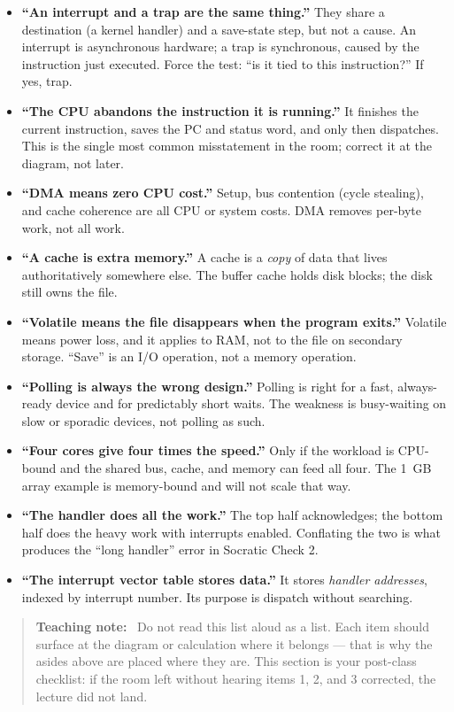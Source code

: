 \documentclass[11pt]{article}
\newenvironment{teachingaside}{\begin{quote}\small\color{primary-gold}\textbf{Teaching note:}\ }{\end{quote}}
\begin{document}
\begin{itemize}
  \item \textbf{``An interrupt and a trap are the same thing.''} They share a
    destination (a kernel handler) and a save-state step, but not a cause. An
    interrupt is asynchronous hardware; a trap is synchronous, caused by the
    instruction just executed. Force the test: ``is it tied to this
    instruction?'' If yes, trap.
  \item \textbf{``The CPU abandons the instruction it is running.''} It finishes
    the current instruction, saves the PC and status word, and only then
    dispatches. This is the single most common misstatement in the room; correct
    it at the diagram, not later.
  \item \textbf{``DMA means zero CPU cost.''} Setup, bus contention (cycle
    stealing), and cache coherence are all CPU or system costs. DMA removes
    per-byte work, not all work.
  \item \textbf{``A cache is extra memory.''} A cache is a \emph{copy} of data
    that lives authoritatively somewhere else. The buffer cache holds disk
    blocks; the disk still owns the file.
  \item \textbf{``Volatile means the file disappears when the program exits.''}
    Volatile means power loss, and it applies to RAM, not to the file on
    secondary storage. ``Save'' is an I/O operation, not a memory operation.
  \item \textbf{``Polling is always the wrong design.''} Polling is right for a
    fast, always-ready device and for predictably short waits. The weakness is
    busy-waiting on slow or sporadic devices, not polling as such.
  \item \textbf{``Four cores give four times the speed.''} Only if the workload
    is CPU-bound and the shared bus, cache, and memory can feed all four. The
    1~GB array example is memory-bound and will not scale that way.
  \item \textbf{``The handler does all the work.''} The top half acknowledges;
    the bottom half does the heavy work with interrupts enabled. Conflating the
    two is what produces the ``long handler'' error in Socratic Check 2.
  \item \textbf{``The interrupt vector table stores data.''} It stores
    \emph{handler addresses}, indexed by interrupt number. Its purpose is
    dispatch without searching.
\end{itemize}

\begin{teachingaside}
Do not read this list aloud as a list. Each item should surface at the diagram or
calculation where it belongs --- that is why the asides above are placed where
they are. This section is your post-class checklist: if the room left without
hearing items 1, 2, and 3 corrected, the lecture did not land.
\end{teachingaside}
\end{document}
